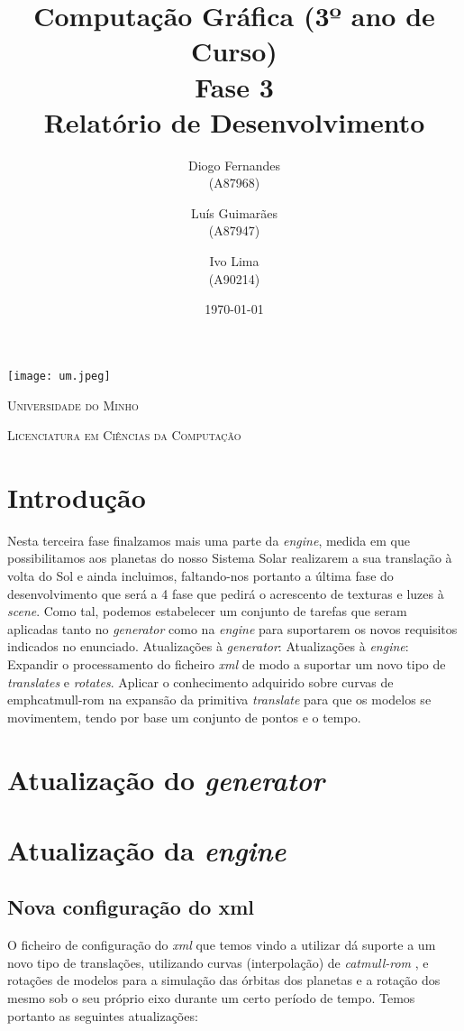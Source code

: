 \documentclass[11pt,a4paper]{report}
\title{Computação Gráfica (3º ano de Curso)\\
       \textbf{Fase 3}\\ Relatório de Desenvolvimento
       } %
\author{Diogo Fernandes\\ (A87968) \and Luís Guimarães\\ (A87947)
         \and Ivo Lima\\ (A90214)
       } %
\date{\today} %
\begin{document}
	\begin{minipage}{0.9\linewidth}
        \centering
		\texttt{[image: um.jpeg]}\par\vspace{1cm}
		{\scshape\LARGE Universidade do Minho} \par
		\vspace{0.6cm}
		{\scshape\Large Licenciatura em Ciências da Computação} \par
		\maketitle
	\end{minipage}


\tableofcontents %

\chapter{Introdução}

Nesta terceira fase finalzamos mais uma parte da \emph{engine}, medida em que possibilitamos aos planetas do nosso Sistema Solar realizarem a sua translação à volta do Sol e ainda incluimos, faltando-nos portanto a última fase do desenvolvimento que será a 4 fase que pedirá o acrescento de texturas e luzes à \emph{scene}. 
Como tal, podemos estabelecer um conjunto de tarefas que seram aplicadas tanto no \emph{generator} como na \emph{engine} para suportarem os novos requisitos indicados no enunciado. 
Atualizações à \emph{generator}:
Atualizações à \emph{engine}:
Expandir o processamento do ficheiro \emph{xml} de modo a suportar um novo tipo de \emph{translates} e \emph{rotates}.
Aplicar o conhecimento adquirido sobre curvas de emph{catmull-rom} na expansão da primitiva \emph{translate} para que os modelos se movimentem, tendo por base um conjunto de pontos e o tempo.

\chapter{Atualização do \emph{generator}}

\chapter{Atualização da \emph{engine}}
\section{Nova configuração do xml}
O ficheiro de configuração do \emph{xml} que temos vindo a utilizar dá suporte a um novo tipo de translações, utilizando curvas (interpolação) de \emph{catmull-rom} , e rotações de modelos para a simulação das órbitas dos planetas e a rotação dos mesmo sob o seu próprio eixo durante um certo período de tempo.
Temos portanto as seguintes atualizações:
\end{document}
